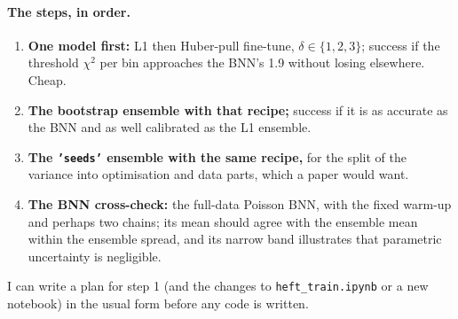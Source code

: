 \documentclass[11pt]{article}
\newcommand{\file}[1]{\nolinkurl{#1}}
\newcommand{\code}[1]{\texttt{#1}}
\begin{document}
\paragraph{The steps, in order.}
\begin{enumerate}
  \item \textbf{One model first:} L1 then Huber-pull fine-tune, $\delta \in \{1, 2, 3\}$;
    success if the threshold $\chi^2$ per bin approaches the BNN's 1.9 without losing
    elsewhere. Cheap.
  \item \textbf{The bootstrap ensemble with that recipe;} success if it is as accurate as the
    BNN and as well calibrated as the L1 ensemble.
  \item \textbf{The \code{'seeds'} ensemble with the same recipe,} for the split of the
    variance into optimisation and data parts, which a paper would want.
  \item \textbf{The BNN cross-check:} the full-data Poisson BNN, with the fixed warm-up and
    perhaps two chains; its mean should agree with the ensemble mean within the ensemble
    spread, and its narrow band illustrates that parametric uncertainty is negligible.
\end{enumerate}
I can write a plan for step 1 (and the changes to \file{heft_train.ipynb} or a new
notebook) in the usual form before any code is written.
\end{document}
